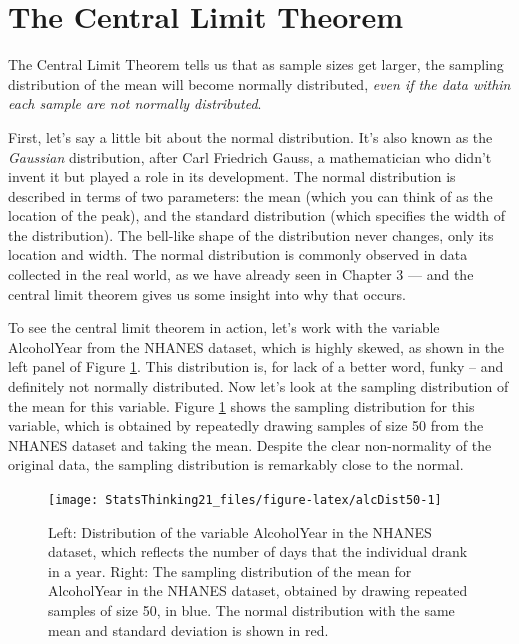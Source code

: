 \documentclass[12pt,]{book}
\theoremstyle{definition}
\theoremstyle{definition}
\theoremstyle{definition}
\theoremstyle{remark}
\begin{document}
\hypertarget{the-central-limit-theorem}{%
\section{The Central Limit Theorem}\label{the-central-limit-theorem}}

The Central Limit Theorem tells us that as sample sizes get larger, the sampling distribution of the mean will become normally distributed, \emph{even if the data within each sample are not normally distributed}.

First, let's say a little bit about the normal distribution. It's also known as the \emph{Gaussian} distribution, after Carl Friedrich Gauss, a mathematician who didn't invent it but played a role in its development. The normal distribution is described in terms of two parameters: the mean (which you can think of as the location of the peak), and the standard distribution (which specifies the width of the distribution). The bell-like shape of the distribution never changes, only its location and width. The normal distribution is commonly observed in data collected in the real world, as we have already seen in Chapter 3 --- and the central limit theorem gives us some insight into why that occurs.

To see the central limit theorem in action, let's work with the variable AlcoholYear from the NHANES dataset, which is highly skewed, as shown in the left panel of Figure \ref{fig:alcDist50}. This distribution is, for lack of a better word, funky -- and definitely not normally distributed. Now let's look at the sampling distribution of the mean for this variable. Figure \ref{fig:alcDist50} shows the sampling distribution for this variable, which is obtained by repeatedly drawing samples of size 50 from the NHANES dataset and taking the mean. Despite the clear non-normality of the original data, the sampling distribution is remarkably close to the normal.

\begin{figure}
\texttt{[image: StatsThinking21\_files/figure-latex/alcDist50-1]} \caption{Left: Distribution of the variable AlcoholYear in the NHANES dataset, which reflects the number of days that the individual drank in a year. Right: The sampling distribution of the mean for AlcoholYear in the NHANES dataset, obtained by drawing repeated samples of size 50, in blue.  The normal distribution with the same mean and standard deviation is shown in red.}\label{fig:alcDist50}
\end{figure}
\end{document}
